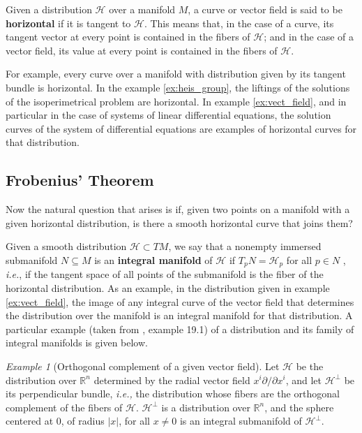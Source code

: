 \documentclass[12pt, letterpaper, reqno]{amsart}
\theoremstyle{definition}
\theoremstyle{plain}
\theoremstyle{remark}
\newtheorem{ex}{Example}
\begin{document}
Given a distribution $ \mathcal{H} $  over a manifold $M$,  a curve or vector field is said to be \textbf{horizontal} if it is tangent to $ \mathcal{H} $. This means that, in the case of a curve, its tangent vector at every point is contained in the fibers of $ \mathcal{H} $; and in the case of a vector field, its value at every point is contained in the fibers of $ \mathcal{H} .$   

For example, every curve over a manifold with distribution given by its tangent bundle is horizontal. In the example \ref{ex:heis_group}, the liftings of the solutions of the isoperimetrical problem are horizontal. In example \ref{ex:vect_field}, and in particular in the case of systems of linear differential equations, the solution curves of the system of differential equations are examples of horizontal curves for that distribution.

\subsection{Frobenius' Theorem}%
\label{sub:frobenius_theorem}


Now the natural question that arises is if, given two points on a manifold with a given horizontal distribution, is there a smooth horizontal curve that joins them? 

Given a smooth distribution $ \mathcal{H} \subset TM$, we say that a nonempty immersed submanifold $ N\subseteq M $  is an \textbf{integral manifold} of $\mathcal{H}$ if $ T_p N = \mathcal{H}_p $ for all $ p\in N $ , \textit{i.e.}, if the tangent space of all points of the submanifold is the fiber of the horizontal distribution. As an example, in the distribution given in example \ref{ex:vect_field}, the image of any integral curve of the vector field that determines the distribution over the manifold is an integral manifold for that distribution. A particular example (taken from \cite{lee2003introduction}, example 19.1) of a distribution and its family of integral manifolds is given below.

\begin{ex}[Orthogonal complement of a given vector field]
Let $ \mathcal{H} $ be the distribution over $ \mathbb{R}^n $ determined by the radial vector field $ x^i \partial / \partial x^i $, and let $ \mathcal{H}^\perp $ be its perpendicular bundle, \textit{i.e.,} the distribution whose fibers are the orthogonal complement of the fibers of $ \mathcal{H}. $ $ \mathcal{H}^\perp $ is a distribution over $ \mathbb{R}^n  $, and the sphere centered at $0$, of radius $ |x| $, for all $ x\neq0 $ is an integral submanifold of $ \mathcal{H}^\perp. $        
\end{ex}
\end{document}

